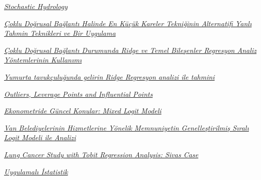 \documentclass[
]{book}
\begin{document}
\href{https://nptel.ac.in/content/storage2/courses/105108079/module7/lecture31.pdf}{\emph{Stochastic Hydrology}}

\href{http://www.acarindex.com/dosyalar/makale/acarindex-1423937309.pdf}{\emph{Çoklu Doğrusal Bağlantı Halinde En Küçük Kareler Tekniğinin Alternatifi Yanlı Tahmin Teknikleri ve Bir Uygulama}}

\href{http://static.dergipark.org.tr:8080/article-download/imported/1025008693/1025007279.pdf?}{\emph{Çoklu Doğrusal Bağlantı Durumunda Ridge ve Temel Bileşenler Regresyon Analiz Yöntemlerinin Kullanımı}}

\href{https://dspace.ankara.edu.tr/xmlui/bitstream/handle/20.500.12575/59591/20427.pdf?sequence=1\&isAllowed=y}{\emph{Yumurta tavukçuluğunda gelirin Ridge Regresyon analizi ile tahmini}}

\href{https://www2.stat.duke.edu/courses/Spring19/sta101.002/post/project/outliers.html}{\emph{Outliers, Leverage Points and Influential Points}}

\href{https://www.researchgate.net/profile/Gozde_Koca/publication/324831528_EKONOMETRIDE_GUNCEL_KONULAR/links/5c2c88c992851c22a3547b3f/EKONOMETRIDE-GUeNCEL-KONULAR.pdf\#page=32}{\emph{Ekonometride Güncel Konular: Mixed Logit Modeli}}

\href{https://www.gecekitapligi.com/Webkontrol/uploads/Fck/yayin4_3.pdf\#page=88}{\emph{Van Belediyelerinin Hizmetlerine Yönelik Memnuniyetin Genelleştirilmiş Sıralı Logit Modeli ile Analizi}}

\href{https://www.semanticscholar.org/paper/Lung-Cancer-Study-with-Tobit-Regression-Analysis\%3A-Zorlutuna-Erilli/327a4952217d1c03c603db02fa6c43c47873f2c0}{\emph{Lung Cancer Study with Tobit Regression Analysis: Sivas Case}}

\href{http://auzefkitap.istanbul.edu.tr/kitap/iktisat_ue/uygulamaliista.pdf}{\emph{Uygulamalı İstatistik}}

  
\end{document}
